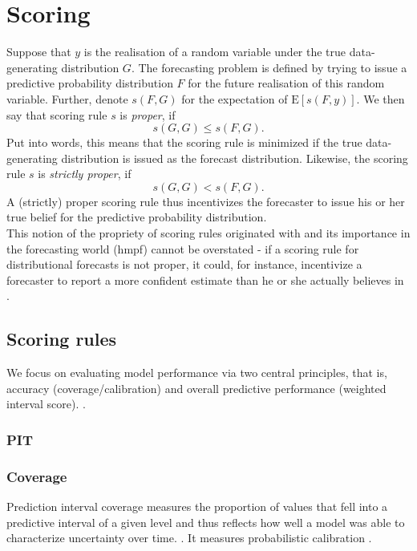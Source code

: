\section{Scoring}
Suppose that $y$ is the realisation of a random variable under the true data-generating distribution $G$. The forecasting problem is defined by trying to issue a predictive probability distribution $F$ for the future realisation of this random variable. Further, denote $s(F,G)$ for the expectation of $\text{E}[s(F,y)]$. We then say that scoring rule $s$ is \textit{proper}, if 
\[s(G,G) \leq s(F,G).\]
Put into words, this means that the scoring rule is minimized if the true data-generating distribution is issued as the forecast distribution. Likewise, the scoring rule $s$ is \textit{strictly proper}, if 
\[s(G,G) < s(F,G).\] 
A (strictly) proper scoring rule thus incentivizes the forecaster to issue his or her true belief for the predictive probability distribution.\\
This notion of the propriety of scoring rules originated with  and its importance in the forecasting world (hmpf) cannot be overstated - if a scoring rule for distributional forecasts is not proper, it could, for instance, incentivize a forecaster to report a more confident estimate than he or she actually believes in . \\
\subsection{Scoring rules}
We focus on evaluating model performance via two central principles, that is, accuracy (coverage/calibration) and overall predictive performance (weighted interval score). \citep{sherratt_predictive_2022}.
\subsubsection{PIT}
\subsubsection{Coverage}
Prediction interval coverage measures the proportion of values that fell into a predictive interval of a given level and thus reflects how well a model was able to characterize uncertainty over time.\citep{cramer_evaluation_2022} . It measures probabilistic calibration \citep{bosse_evaluating_2022}.

